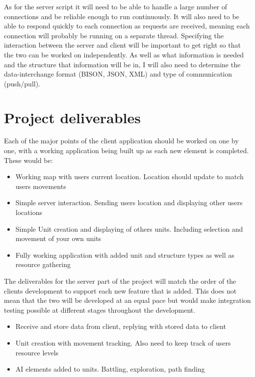 \documentclass[11pt,fleqn,twoside]{article}
\begin{document}
As for the server script it will need to be able to handle a large number of connections and be reliable enough to run continuously. It will also need to be able to respond quickly to each connection as requests are received, meaning each connection will probably be running on a separate thread. Specifying the interaction between the server and client will be important to get right so that the two can be worked on independently. As well as what information is needed and the structure that information will be in, I will also need to determine the data-interchange format (BISON, JSON, XML) and type of communication (push/pull).


\section{Project deliverables}

Each of the major points of the client application should be worked on one by one, with a working application being built up as each new element is completed. These would be:
\begin{itemize}
\item Working map with users current location. Location should update to match users movements
\item Simple server interaction. Sending users location and displaying other users locations
\item Simple Unit creation and displaying of others units. Including selection and movement of your own units
\item Fully working application with added unit and structure types as well as resource gathering
\end{itemize}

The deliverables for the server part of the project will match the order of the clients development to support each new feature that is added. This does not mean that the two will be developed at an equal pace but would make integration testing possible at different stages throughout the development.
\begin{itemize}
\item Receive and store data from client, replying with stored data to client
\item Unit creation with movement tracking. Also need to keep track of users resource levels
\item AI elements added to units. Battling, exploration, path finding
\end{itemize}
\end{document}
